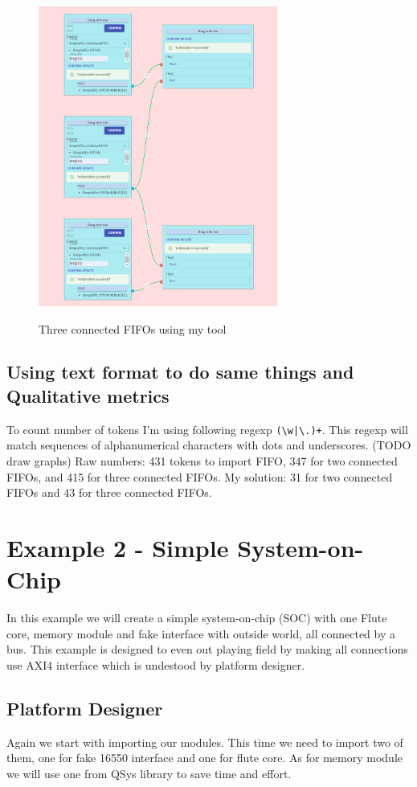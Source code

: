 \documentclass[12pt]{report}
\begin{document}
\begin{figure}
    \caption{Three connected FIFOs using my tool}
    \includegraphics[width=0.7\textwidth]{images/Example1MySolution.png} \\
    \centering
\end{figure}

\subsection{Using text format to do same things and Qualitative metrics}
To count number of tokens I'm using following regexp \verb!(\w|\.)+!. This regexp will match sequences of alphanumerical characters with dots and underscores. (TODO draw graphs)
Raw numbers: 431 tokens to import FIFO, 347 for two connected FIFOs, and 415 for three connected FIFOs.
My solution: 31 for two connected FIFOs and 43 for three connected FIFOs.

\section{Example 2 - Simple System-on-Chip}
In this example we will create a simple system-on-chip (SOC) with one Flute core, memory module and fake interface with outside world, all connected by a bus. This example is designed to even out playing field by making all connections use AXI4 interface which is undestood by platform designer.

\subsection{Platform Designer}
Again we start with importing our modules. 
This time we need to import two of them, one for fake 16550 interface and one for flute core. 
As for memory module we will use one from QSys library to save time and effort.
\end{document}
